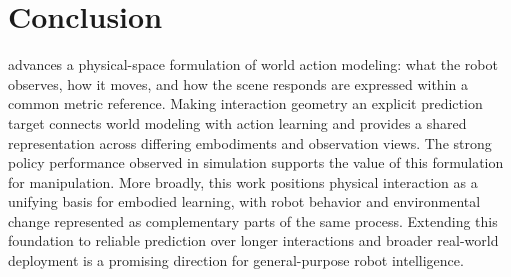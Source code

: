 \vspace{-0.3cm}
\section{Conclusion}
\label{sec:conclusion}
\vspace{-0.2cm}

\method{} advances a physical-space formulation of world action modeling:
what the robot observes, how it moves, and how the scene responds are expressed
within a common metric reference. Making interaction geometry an explicit
prediction target connects world modeling with action learning and provides
a shared representation across differing embodiments and observation views.
The strong policy performance observed in simulation supports the value of
this formulation for manipulation. More broadly, this work positions
physical interaction as a unifying basis for embodied learning, with robot
behavior and environmental change represented as complementary parts of the
same process. Extending this foundation to reliable prediction over longer
interactions and broader real-world deployment is a promising direction
for general-purpose robot intelligence.
